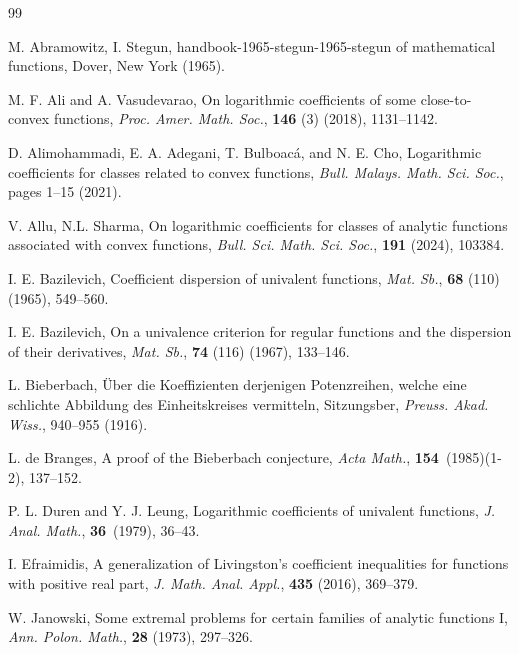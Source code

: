 \documentclass[a4paper,12pt]{amsart}
\theoremstyle{definition}
\begin{document}
\begin{thebibliography}{99}

{\sc M. Abramowitz, I. Stegun}, handbook-1965-stegun-1965-stegun of mathematical functions, Dover, New York (1965).


 {\sc M. F. Ali and A. Vasudevarao}, On logarithmic coefficients of some close-to-convex functions,
 {\it Proc. Amer. Math. Soc.}, {\bf 146} (3) (2018), 1131--1142.
 

 
  {\sc D. Alimohammadi, E. A. Adegani, T. Bulboac\'a, and N. E. Cho}, Logarithmic coefficients for classes related to convex functions, {\it Bull. Malays. Math. Sci. Soc.}, pages 1--15 (2021).

{\sc V. Allu, N.L. Sharma}, On logarithmic coefficients for classes of analytic functions associated with
 convex functions, {\it Bull. Sci. Math. Sci. Soc.}, \textbf{191} (2024), 103384.
 
{\sc I. E. Bazilevich}, Coefficient dispersion of univalent functions, {\it Mat. Sb.}, {\bf 68} (110) (1965), 549--560.

{\sc I. E. Bazilevich}, On a univalence criterion for regular functions and the dispersion of their derivatives, {\it Mat. Sb.}, {\bf 74} (116) (1967), 133--146.

{\sc L. Bieberbach}, \"{U}ber die Koeffizienten derjenigen Potenzreihen, welche eine schlichte Abbildung des Einheitskreises vermitteln, Sitzungsber, {\it Preuss. Akad. Wiss.}, 940--955 (1916).

{\sc L. de Branges}, A proof of the Bieberbach conjecture, {\it Acta Math.}, {\bf 154}~(1985)(1-2), 137--152.


{\sc P. L. Duren and Y. J. Leung}, Logarithmic coefficients of univalent functions, {\it J. Anal. Math.}, {\bf 36}~(1979), 36--43.

{\sc I. Efraimidis},  A generalization of Livingston’s coefficient inequalities for functions with positive real part, \textit{J. Math. Anal. Appl.}, \textbf{435} (2016), 369--379.

{\sc W. Janowski},
Some extremal problems for certain families of analytic functions I,
{\it Ann. Polon. Math.}, \textbf{28} (1973), 297--326.




\end{thebibliography}
\end{document}
